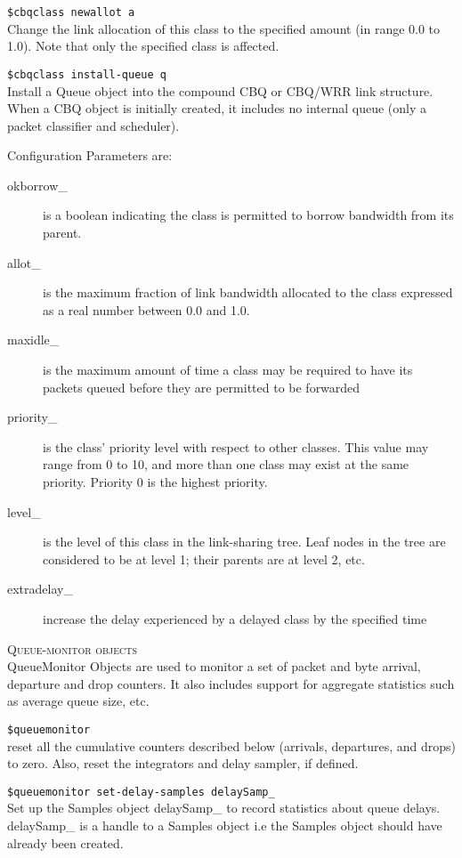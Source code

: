 {\tt \$cbqclass newallot \<a\>}\\
Change the link allocation of this class to the specified amount (in range
0.0 to 1.0). Note that only the specified class is affected. 

{\tt \$cbqclass install-queue \<q\>}\\
Install a Queue object into the compound CBQ or CBQ/WRR link structure.
When a CBQ object is initially created, it includes no internal queue
(only a packet classifier and scheduler).

Configuration Parameters are:
\begin{description}
\item[okborrow\_] is a boolean indicating the class is permitted to borrow
bandwidth from its parent. 

\item[allot\_] is the maximum fraction of link bandwidth allocated to the
class expressed as a real number between 0.0 and 1.0. 

\item[maxidle\_] is the maximum amount of time a class may be required to
have its packets queued before they are permitted to be forwarded 

\item[priority\_]
is the class' priority level with respect to other classes. This value may
range from 0 to 10, and more than one class may exist at the same
priority. Priority 0 is the highest priority. 

\item[level\_]
is the level of this class in the link-sharing tree. Leaf nodes in the
tree are considered to be at level 1; their parents are at level 2, etc. 

\item[extradelay\_]
increase the delay experienced by a delayed class by the specified time 
\end{description}


\textsc{Queue-monitor objects}\\
QueueMonitor Objects are used to monitor a set of packet and byte arrival,
departure and drop counters. It also includes support for aggregate
statistics such as average queue size, etc.

{\tt \$queuemonitor}\\
reset all the cumulative counters described below (arrivals, departures,
and drops) to zero. Also, reset the integrators and delay sampler, if
defined. 

{\tt \$queuemonitor set-delay-samples \<delaySamp\_\>}\\
Set up the Samples object delaySamp\_ to record statistics about queue
delays. delaySamp\_ is a handle to a Samples object i.e the Samples object
should have already been created. 

